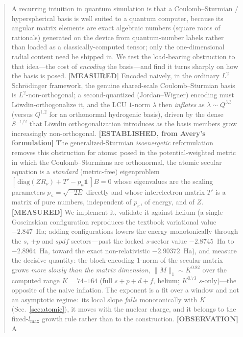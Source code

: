 \documentclass[aps,pra,twocolumn,superscriptaddress,longbibliography]{revtex4-2}
\newcommand{\gvq}[2]{#2}
\begin{document}
\begin{abstract}
A recurring intuition in quantum simulation is that a Coulomb--Sturmian /
hyperspherical basis is well suited to a quantum computer, because its angular
matrix elements are exact algebraic numbers (square roots of rationals) generated on the device from
quantum-number labels rather than loaded as a classically-computed tensor;
only the one-dimensional radial content need be shipped in.  We test the load-bearing
obstruction to that idea---the cost of \emph{encoding} the basis---and find it
turns sharply on how the basis is posed.  \textbf{[MEASURED]} Encoded naively,
in the ordinary $L^2$ Schr\"odinger framework, the genuine shared-scale
Coulomb--Sturmian basis is $L^2$-non-orthogonal; a second-quantized (Jordan--Wigner)
encoding must L\"owdin-orthogonalize it, and the LCU $1$-norm $\lambda$ then
\emph{inflates} as $\lambda\sim Q^{3.3}$ (versus $Q^{1.2}$ for an orthonormal
hydrogenic basis), driven by the dense $S^{-1/2}$ that L\"owdin
orthogonalization introduces as the basis members grow increasingly
non-orthogonal.
\textbf{[ESTABLISHED, from Avery's formulation]} The generalized-Sturmian
\emph{isoenergetic} reformulation removes this obstruction for atoms: posed in
the potential-weighted metric in which the Coulomb--Sturmians are orthonormal,
the atomic secular equation is a \emph{standard} (metric-free) eigenproblem
$[\,\mathrm{diag}(Z R_\nu)+T'-p_\kappa\mathbb{1}\,]B=0$ whose eigenvalues are the
scaling parameters $p_\kappa=\sqrt{-2E}$ directly and whose interelectron matrix
$T'$ is a matrix of pure numbers, independent of $p_\kappa$, of energy, and of
$Z$.  \textbf{[MEASURED]} We implement it, validate it against helium (a single
Goscinskian configuration reproduces the textbook variational value
$-2.847$~Ha; adding configurations lowers the energy monotonically through
the $s$, $+p$ and $spdf$ sectors---past the locked $s$-sector value $\gvq{p60_he_chain_s_k55}{-2.8745}$~Ha to
$\gvq{p60_he_chain_spdf_k164}{-2.8964}$~Ha, toward the exact non-relativistic $-2.90372$~Ha), and measure the decisive quantity: the block-encoding $1$-norm of the
secular matrix grows \emph{more slowly than the matrix dimension},
$\|M\|_1\sim K^{\gvq{p60_onenorm_exponent}{0.82}}$ over the computed range
$K=74$--$164$ (full $s\!+\!p\!+\!d\!+\!f$, helium;
$K^{\gvq{p60_onenorm_exponent_sonly}{0.73}}$ $s$-only)---the opposite of the
naive inflation.  The exponent is a fit over a window and not an asymptotic
regime:\ its local slope \emph{falls} monotonically with $K$
(Sec.~\ref{sec:atomic}), it moves with the nuclear charge, and it belongs to
the fixed-$l_{\max}$ growth rule rather than to the construction.  \textbf{[OBSERVATION]} A

\end{abstract}
\end{document}
